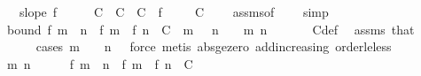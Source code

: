 \begin{isabellebody}
\ \ \ {\isachardoublequoteopen}slope\ f{\isachardoublequoteclose}\isanewline
%
\isadelimproof
%
\endisadelimproof
%
\isatagproof
{}\isamarkupfalse%
\ {\isacharminus}{\kern0pt}\isanewline
\ \ \isamarkupfalse%
\ C{\isacharprime}{\kern0pt}\ \ {\isachardoublequoteopen}C{\isacharprime}{\kern0pt}\ {\isacharequal}{\kern0pt}\ C\ {\isacharplus}{\kern0pt}\ {\isasymbar}f\ {}{\isasymbar}{\isachardoublequoteclose}\isanewline
\ \ \isamarkupfalse%
\ {\isachardoublequoteopen}C\ {\isasymge}\ {}{\isachardoublequoteclose}\ \isamarkupfalse%
\ assms{\isacharparenleft}{\kern0pt}{}{\isacharparenright}{\kern0pt}{\isacharbrackleft}{\kern0pt}of\ {}\ {}{\isacharbrackright}{\kern0pt}\ \isamarkupfalse%
\ simp\isanewline
\ \ \isamarkupfalse%
\ bound{\isacharcolon}{\kern0pt}\ {\isachardoublequoteopen}{\isasymbar}f\ {\isacharparenleft}{\kern0pt}m\ {\isacharplus}{\kern0pt}\ n{\isacharparenright}{\kern0pt}\ {\isacharminus}{\kern0pt}\ {\isacharparenleft}{\kern0pt}f\ m\ {\isacharplus}{\kern0pt}\ f\ n{\isacharparenright}{\kern0pt}{\isasymbar}\ {\isasymle}\ C{\isacharprime}{\kern0pt}{\isachardoublequoteclose}\ \ {\isachardoublequoteopen}m\ {\isasymge}\ {}{\isachardoublequoteclose}\ {\isachardoublequoteopen}n\ {\isasymge}\ {}{\isachardoublequoteclose}\ \ m\ n\ \isanewline
\ \ \ \ \isamarkupfalse%
\ C{\isacharprime}{\kern0pt}{\isacharunderscore}{\kern0pt}def\ \isamarkupfalse%
\ assms{\isacharparenleft}{\kern0pt}{}{\isacharparenright}{\kern0pt}\ that\ \isanewline
\ \ \ \ \isamarkupfalse%
\ {\isacharparenleft}{\kern0pt}cases\ {\isachardoublequoteopen}m\ {\isacharequal}{\kern0pt}\ {}\ {\isasymor}\ n\ {\isacharequal}{\kern0pt}\ {}{\isachardoublequoteclose}{\isacharparenright}{\kern0pt}\ {\isacharparenleft}{\kern0pt}force{\isacharcomma}{\kern0pt}\ metis\ abs{\isacharunderscore}{\kern0pt}ge{\isacharunderscore}{\kern0pt}zero\ add{\isacharunderscore}{\kern0pt}increasing{}\ order{\isacharunderscore}{\kern0pt}le{\isacharunderscore}{\kern0pt}less{\isacharparenright}{\kern0pt}\isanewline
\ \ \isacommand{{\isacharbraceleft}{\kern0pt}}\isamarkupfalse%
\isanewline
\ \ \ \ \isamarkupfalse%
\ m\ n\isanewline
\ \ \ \ \isamarkupfalse%
\ {\isachardoublequoteopen}{\isasymbar}f\ {\isacharparenleft}{\kern0pt}m\ {\isacharplus}{\kern0pt}\ n{\isacharparenright}{\kern0pt}\ {\isacharminus}{\kern0pt}\ {\isacharparenleft}{\kern0pt}f\ m\ {\isacharplus}{\kern0pt}\ f\ n{\isacharparenright}{\kern0pt}{\isasymbar}\ {\isasymle}\ C{\isacharprime}{\kern0pt}{\isachardoublequoteclose}\isanewline

\end{isabellebody}
